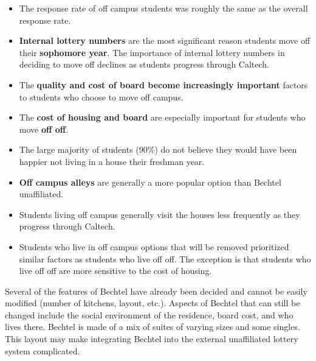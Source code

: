 \documentclass[12pt]{article} %
\begin{document}
\begin{itemize}
\item The response rate of off campus students was roughly the same as the overall response rate.
\item \textbf{Internal lottery numbers} are the most significant reason students move off their \textbf{sophomore year}. The importance of internal lottery numbers in deciding to move off declines as students progress through Caltech.
\item The \textbf{quality and cost of board become increasingly important} factors to students who choose to move off campus.
\item The \textbf{cost of housing and board} are especially important for students who move \textbf{off off}.
\item The large majority of students (90\%) do not believe they would have been happier not living in a house their freshman year.
\item \textbf{Off campus alleys} are generally a more popular option than Bechtel unaffiliated.
\item Students living off campus generally visit the houses less frequently as they progress through Caltech.
\item Students who live in off campus options that will be removed prioritized similar factors as students who live off off. The exception is that students who live off off are more sensitive to the cost of housing.
\end{itemize}

Several of the features of Bechtel have already been decided and cannot be easily modified (number of kitchens, layout, etc.). Aspects of Bechtel that can still be changed include the social environment of the residence, board cost, and who lives there. Bechtel is made of a mix of suites of varying sizes and some singles. This layout may make integrating Bechtel into the external unaffiliated lottery system complicated.
\end{document}
